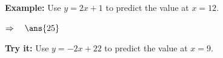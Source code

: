 \documentclass[12pt]{article}
\begin{document}
\begin{examplebox}
\textbf{Example:} \quad Use $y = 2x + 1$ to predict the value at $x = 12$.

$\Rightarrow\quad \ans{25}$
\end{examplebox}

\begin{tryitbox}
\textbf{Try it:} \quad Use $y = -2x + 22$ to predict the value at $x = 9$.\\[2pt]
\end{tryitbox}
\end{document}
